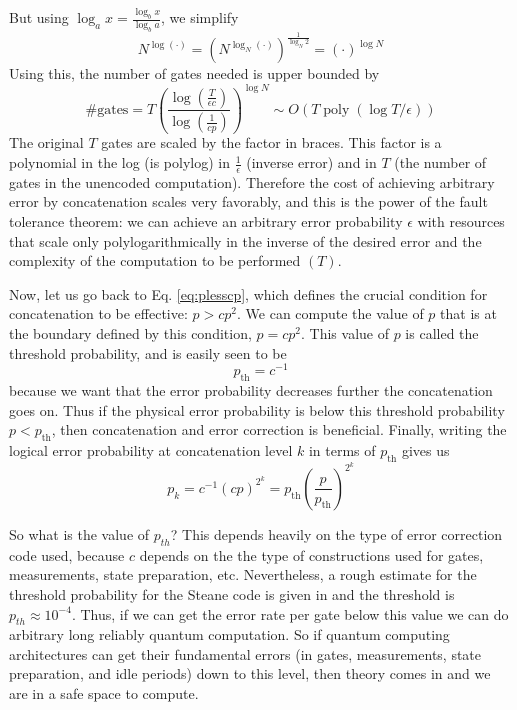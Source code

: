 But using $\log _{a} x=\frac{\log _{b} x}{\log _{b} a}$, we simplify
$$
N^{\log (\cdot)}=\left(N^{\log _{N}(\cdot)}\right)^{\frac{1}{\log _{N} 2}}=(\cdot)^{\log N}
$$
Using this, the number of gates needed is upper bounded by
$$
\# \text{gates} = T\left(\frac{\log \left(\frac{T}{\epsilon c}\right)}{\log \left(\frac{1}{c p}\right)}\right)^{\log N} \sim  O(T\operatorname{poly}(\log T / \epsilon))
$$
The original $T$ gates are scaled by the factor in braces. This factor is a polynomial in the log (is polylog) in $\frac{1}{\epsilon}$ (inverse error) and in $T$ (the number of gates in the unencoded computation). Therefore the cost of achieving arbitrary error by concatenation scales very favorably, and this is the power of the fault tolerance theorem: we can achieve an arbitrary error probability $\epsilon$ with resources that scale only polylogarithmically in the inverse of the desired error and the complexity of the computation to be performed $(T)$.

Now, let us go back to Eq. \ref{eq:plesscp}, which defines the crucial condition for concatenation to be effective: $p>c p^{2}$. We can compute the value of $p$ that is at the boundary defined by this condition, $p=c p^{2}$. This value of $p$ is called the threshold probability, and is easily seen to be
$$
p_{\mathrm{th}}=c^{-1}
$$
because we want that the error probability decreases further the concatenation goes on.
Thus if the physical error probability is below this threshold probability $p<p_{\mathrm{th}}$, then concatenation and error correction is beneficial. Finally, writing the logical error probability at concatenation level $k$ in terms of $p_{\mathrm{th}}$ gives us
$$
p_{k}=c^{-1}(c p)^{2^{k}}=p_{\mathrm{th}}\left(\frac{p}{p_{\mathrm{th}}}\right)^{2^{k}}
$$



So what is the value of $p_{th}$? This depends heavily on the type of error correction code used, because $c$ depends on the the type of constructions used for gates, measurements, state preparation, etc. Nevertheless, a rough estimate for the threshold probability for the Steane code is given in \cite{Chuang} and the threshold is $p_{th} \approx 10^{-4}$. Thus, if we can get the error rate per gate below this value we can do arbitrary long reliably quantum computation. So if quantum computing architectures can get their fundamental errors (in gates, measurements, state preparation, and idle periods) down to this level, then theory comes in and we are in a safe space to compute.

